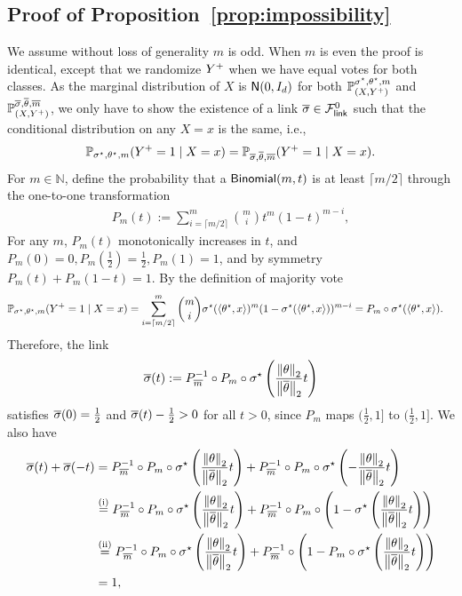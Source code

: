 \subsection{Proof of Proposition~\ref{prop:impossibility}} \label{proof:impossibility}
We assume without loss of generality $m$ is odd. When $m$ is even the proof
is identical, except that we randomize $Y^+$ when we have equal votes for
both classes. As the marginal distribution of $X$ is $\mathsf{N}(0, I_d)$ for
both $\mathbb{P}_{(X,Y^+)}^{\sigma^\star, \theta^\star, m}$ and
$\mathbb{P}_{(X,Y^+)}^{\overline{\sigma}, \overline{\theta}, \overline{m}}$, we only have to show
the existence of a link $\overline{\sigma} \in \mathcal{F}_{\mathsf{link}}^0$ such that the
conditional distribution on any $X=x$ is the same, i.e.,
\begin{align*}
  \mathbb{P}_{\sigma^\star, \theta^\star, m} (Y^+ = 1 \mid X=x) =
  \mathbb{P}_{\overline{\sigma}, \overline{\theta}, \overline{m}}(Y^+ = 1 \mid X=x) .
\end{align*}
For $m \in \mathbb{N}$, define the probability that a $\mathsf{Binomial}(m, t)$ is at
least $\lceil m / 2 \rceil$ through the one-to-one transformation
\begin{align*}
  P_m(t) := \sum_{i=\lceil m/2 \rceil}^m \binom{m}{i} t^m(1-t)^{m-i}   ,
\end{align*}
 For any $m$, $P_m(t)$ monotonically increases in $t$, and $P_m(0)= 0, P_m(\frac{1}{2}) = \frac{1}{2}, P_m(1) = 1$, and by symmetry $P_m(t) + P_m(1-t) = 1$. By the definition of majority vote
\begin{align*}
	\mathbb{P}_{\sigma^\star, \theta^\star, m} (Y^+ = 1 \mid X=x) & = \sum_{i=\lceil m/2 \rceil}^m \binom{m}{i} \sigma^\star(\langle \theta^\star, x \rangle)^m(1-\sigma^\star(\langle \theta^\star, x \rangle))^{m-i} = P_m \circ \sigma^\star(\langle \theta^\star, x \rangle).
\end{align*}
Therefore, the link
\begin{align*}
	\overline{\sigma}(t) := P_{\overline{m}}^{-1} \circ P_{m} \circ \sigma^\star \left(\frac{\left\|{\theta}\right\|_2}{\left\|{\overline{\theta}}\right\|_2} t \right)
\end{align*}
satisfies $\overline{\sigma}(0) = \frac{1}{2}$ and $\overline{\sigma}(t) - \frac{1}{2} > 0$ for all $t > 0$, since $P_m$ maps $(\frac 1 2, 1]$ to $(\frac 1 2 , 1]$. We also have
\begin{align*}
	\overline{\sigma}(t) + \overline{\sigma}(-t) & = P_{\overline{m}}^{-1} \circ P_{m} \circ \sigma^\star \left(\frac{\left\|{\theta}\right\|_2}{\left\|{\overline{\theta}}\right\|_2} t \right) + P_{\overline{m}}^{-1} \circ P_{m} \circ \sigma^\star \left(-\frac{\left\|{\theta}\right\|_2}{\left\|{\overline{\theta}}\right\|_2} t \right) \nonumber \\
	& \stackrel{\mathrm{(i)}}{=} P_{\overline{m}}^{-1} \circ P_{m} \circ \sigma^\star \left(\frac{\left\|{\theta}\right\|_2}{\left\|{\overline{\theta}}\right\|_2} t \right) + P_{\overline{m}}^{-1} \circ P_{m} \circ \left(1 - \sigma^\star \left(\frac{\left\|{\theta}\right\|_2}{\left\|{\overline{\theta}}\right\|_2} t \right) \right) \nonumber \\
	& \stackrel{\mathrm{(ii)}}{=} P_{\overline{m}}^{-1} \circ P_{m} \circ \sigma^\star \left(\frac{\left\|{\theta}\right\|_2}{\left\|{\overline{\theta}}\right\|_2} t \right) + P_{\overline{m}}^{-1} \circ \left(1 -  P_m \circ \sigma^\star \left(\frac{\left\|{\theta}\right\|_2}{\left\|{\overline{\theta}}\right\|_2} t \right)\right) \nonumber \\
	& = 1   ,
\end{align*}
